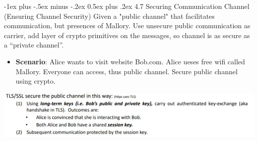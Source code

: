 \documentclass[10pt, landscape]{article}
\makeatletter
\renewcommand{\section}{\@startsection{section}{1}{0mm}%
                                {-1ex plus -.5ex minus -.2ex}%
                                {0.5ex plus .2ex}%
                                {\normalfont\large\bfseries}}
\makeatother
\begin{document}
\begin{multicols*}{3}
\section{4.7 Securing Communication Channel (Ensuring Channel Security)}
Given a "public channel" that facilitates communication, but presences of Mallory. Use unsecure public communication as carrier, add layer of crypto primitives on the messages, so channel is as secure as a “private channel”.
\begin{itemize}
\item \textbf{Scenario}: Alice wants to visit website Bob.com. Alice ueses free wifi called Mallory.  Everyone can access, thus public channel. Secure public channel using crypto. 
\end{itemize}
\centerline{\includegraphics[width=1\linewidth]{tls1}}





\end{multicols*}
\end{document}
